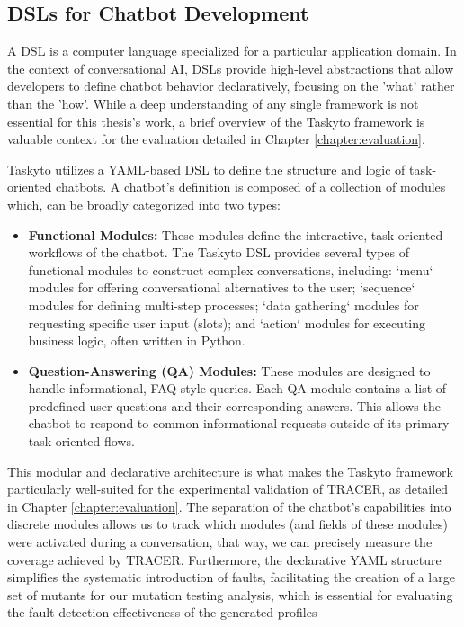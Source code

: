 \subsection{\aclp{DSL} for Chatbot Development}

A \acl{DSL} is a computer language
specialized for a particular application domain.
In the context of conversational AI,
\acp{DSL} provide high-level abstractions
that allow developers to define chatbot behavior declaratively,
focusing on the 'what' rather than the 'how'.
While a deep understanding of any single framework
is not essential for this thesis's work,
a brief overview of the Taskyto framework
\autocite{sanchezcuadradoAutomatingDevelopmentTaskoriented2024}
is valuable context for the evaluation
detailed in Chapter \ref{chapter:evaluation}.

Taskyto utilizes a YAML-based \ac{DSL}
to define the structure and logic of task-oriented chatbots.
A chatbot's definition is composed of a collection of modules which,
can be broadly categorized into two types:


\begin{itemize}
    \item \textbf{Functional Modules:}
      These modules define the interactive,
      task-oriented workflows of the chatbot.
      The Taskyto DSL provides several types of functional modules
      to construct complex conversations, including:
      `menu` modules for offering conversational alternatives to the user;
      `sequence` modules for defining multi-step processes;
      `data gathering` modules for requesting specific user input (slots);
      and `action` modules for executing business logic, often written in Python.

    \item \textbf{Question-Answering (QA) Modules:}
      These modules are designed to handle informational, FAQ-style queries.
      Each QA module contains
      a list of predefined user questions
      and their corresponding answers.
      This allows the chatbot to respond
      to common informational requests
      outside of its primary task-oriented flows.
\end{itemize}

This modular and declarative architecture
is what makes the Taskyto framework particularly well-suited
for the experimental validation of TRACER,
as detailed in Chapter \ref{chapter:evaluation}.
The separation of the chatbot's capabilities into discrete modules
allows us to track which modules
(and fields of these modules)
were activated during a conversation,
that way, we can precisely measure the coverage
achieved by \ac{TRACER}.
Furthermore, the declarative YAML structure
simplifies the systematic introduction of faults,
facilitating the creation of a large set of mutants
for our mutation testing analysis,
which is essential for evaluating
the fault-detection effectiveness of the generated profiles

